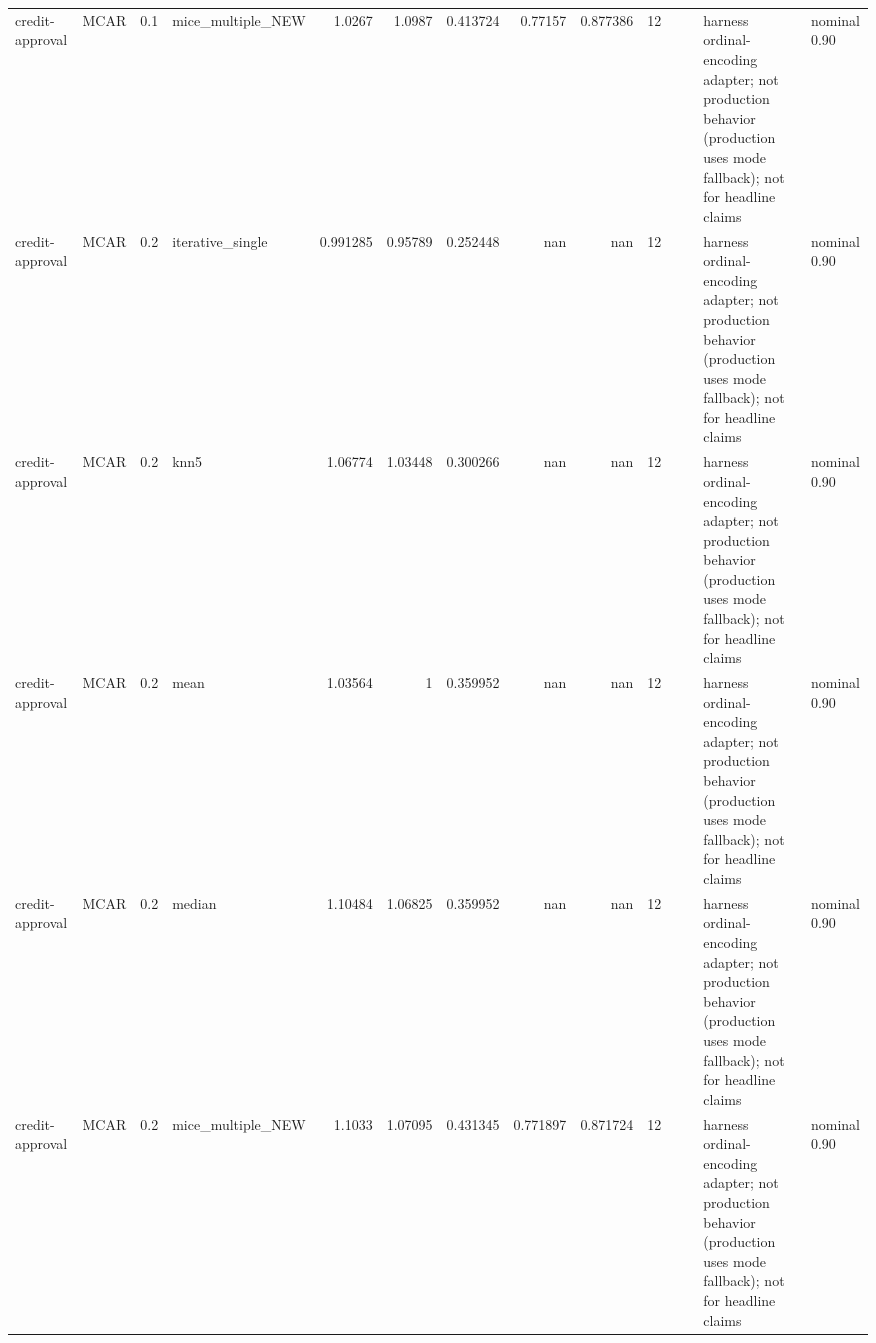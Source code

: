 \begin{table}[ht]
\begin{tabular}{llrlrrrrrrllll}
 credit-approval      & MCAR        &         0.1 & mice\_multiple\_NEW &       1.0267   &             1.0987   &                 0.413724 &                       0.77157  &                         0.877386 &        12 &                    &                                         & harness ordinal-encoding adapter; not production behavior (production uses mode fallback); not for headline claims & nominal 0.90              \\
 credit-approval      & MCAR        &         0.2 & iterative\_single  &       0.991285 &             0.95789  &                 0.252448 &                     nan        &                       nan        &        12 &                    &                                         & harness ordinal-encoding adapter; not production behavior (production uses mode fallback); not for headline claims & nominal 0.90              \\
 credit-approval      & MCAR        &         0.2 & knn5              &       1.06774  &             1.03448  &                 0.300266 &                     nan        &                       nan        &        12 &                    &                                         & harness ordinal-encoding adapter; not production behavior (production uses mode fallback); not for headline claims & nominal 0.90              \\
 credit-approval      & MCAR        &         0.2 & mean              &       1.03564  &             1        &                 0.359952 &                     nan        &                       nan        &        12 &                    &                                         & harness ordinal-encoding adapter; not production behavior (production uses mode fallback); not for headline claims & nominal 0.90              \\
 credit-approval      & MCAR        &         0.2 & median            &       1.10484  &             1.06825  &                 0.359952 &                     nan        &                       nan        &        12 &                    &                                         & harness ordinal-encoding adapter; not production behavior (production uses mode fallback); not for headline claims & nominal 0.90              \\
 credit-approval      & MCAR        &         0.2 & mice\_multiple\_NEW &       1.1033   &             1.07095  &                 0.431345 &                       0.771897 &                         0.871724 &        12 &                    &                                         & harness ordinal-encoding adapter; not production behavior (production uses mode fallback); not for headline claims & nominal 0.90              \\

\end{tabular}
\end{table}
